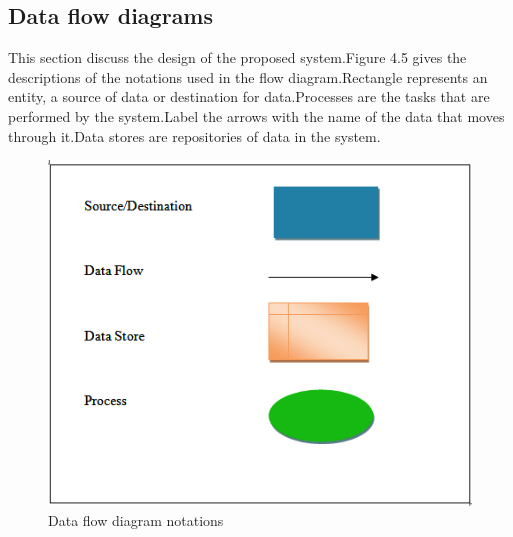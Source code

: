 \subsection[Data Flow Diagrams]{Data flow diagrams}
\noindent
\justifying
This section discuss the design of the proposed system.Figure 4.5 gives the descriptions of the notations used in the flow diagram.Rectangle represents an entity, a source of data or destination for data.Processes are the tasks that are performed by the system.Label the arrows with the name of the data that moves through it.Data stores are repositories of data in the system.
 \begin{figure}[H]
 \centering
  \includegraphics[scale=1]{ndfd0.png}
  \caption[Data Flow Diagram Notations]{Data flow diagram notations}
  \label{pf}
\end{figure}

